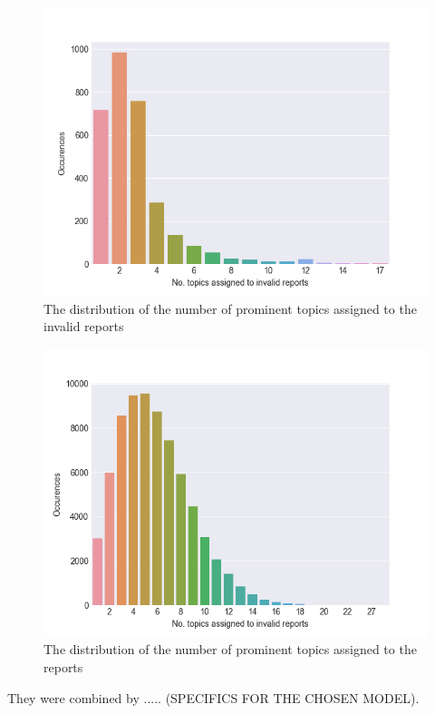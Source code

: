 \begin{figure}
    \centering
    \includegraphics[scale=0.8]{figures/no_topics_per_invalid_report}
    \caption{The distribution of the number of prominent topics assigned to the invalid reports}
    \label{fig:no_topics_invalid}
\end{figure}

\begin{figure}
    \centering
    \includegraphics[scale=0.8]{figures/no_topics_per_report}
    \caption{The distribution of the number of prominent topics assigned to the reports}
    \label{fig:no_topics_all}
\end{figure}

They were combined by ..... (SPECIFICS FOR THE CHOSEN MODEL).

